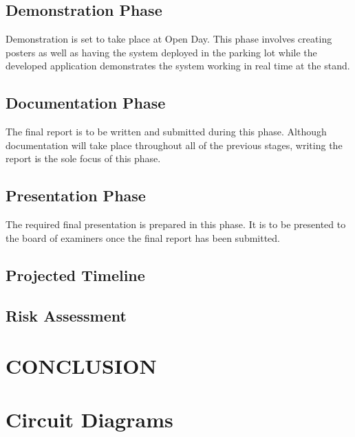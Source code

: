 \documentclass[10pt,twocolumn]{witseiepaper}
\begin{document}
	
	\subsection{Demonstration Phase}
		Demonstration is set to take place at Open Day. This phase involves creating posters as well as having the system deployed in the parking lot while the developed application demonstrates the system working in real time at the stand.
	
	\subsection{Documentation Phase}
		The final report is to be written and submitted during this phase. Although documentation will take place throughout all of the previous stages, writing the report is the sole focus of this phase.
	
	\subsection{Presentation Phase}
		The required final presentation is prepared in this phase. It is to be presented to the board of examiners once the final report has been submitted.
	
	\subsection{Projected Timeline}
	
	\subsection{Risk Assessment}

\section{CONCLUSION}

{}


\clearpage
\onecolumn
\appendix

\section{Circuit Diagrams}
\end{document}
